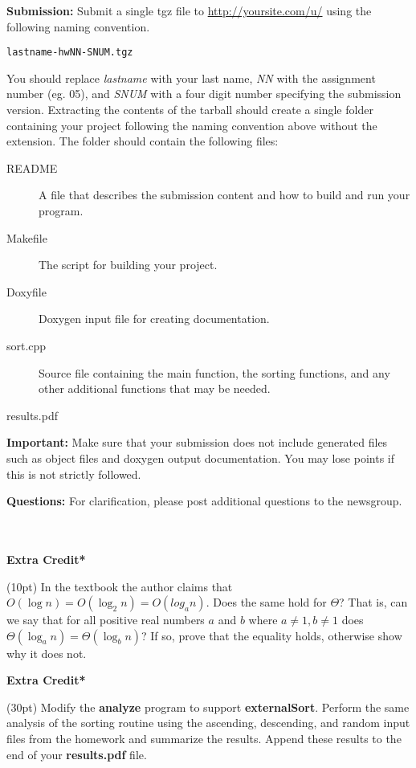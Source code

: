 \documentclass{article}
\newcommand{\ecpts}[1]{\addtocounter{ecpoints}{#1}(#1pt)}
\begin{document}
\begin{spacing}{1.1}
\begin{enumerate}[leftmargin=*, resume]
\textbf{Submission:} Submit a single tgz file to
\url{http://yoursite.com/u/} using the following
naming convention.

\begin{verbatim}
lastname-hwNN-SNUM.tgz
\end{verbatim}

You should replace \emph{lastname} with your last name, \emph{NN} with
the assignment number (eg. 05), and \emph{SNUM} with a four digit
number specifying the submission version.  Extracting the contents of
the tarball should create a single folder containing your project
following the naming convention above without the extension.  The
folder should contain the following files:

\begin{description}
  \item[README] A file that describes the submission content and how
    to build and run your program.
  \item[Makefile] The script for building your project.
  \item[Doxyfile] Doxygen input file for creating documentation.
  \item[sort.cpp] Source file containing the main function, the
    sorting functions, and any other additional functions that may be
    needed.
  \item[results.pdf] 
\end{description}

\textbf{Important:} Make sure that your submission does not include
generated files such as object files and doxygen output
documentation. You may lose points if this is not strictly followed.

\textbf{Questions:} For clarification, please post additional questions to the
newsgroup.

\end{enumerate}

~\\
~\\

\noindent
\textbf{Extra Credit*} \ecpts{10} In the textbook the author claims
that $O(\log n) = O(\log_2 n) = O(log_a n)$.  Does the same hold for
$\Theta$? That is, can we say that for all positive real numbers $a$
and $b$ where $a \ne 1, b \ne 1$ does $\Theta(\log_a n) = \Theta(\log_b n)$? If so, prove that the
equality holds, otherwise show why it does not.

\vspace{12cm}

\noindent
\textbf{Extra Credit*} \ecpts{30} Modify the \textbf{analyze} program
to support \textbf{externalSort}. Perform the same analysis of the
sorting routine using the ascending, descending, and random input
files from the homework and summarize the results.  Append these
results to the end of your \textbf{results.pdf} file.
\end{spacing}
\end{document}
